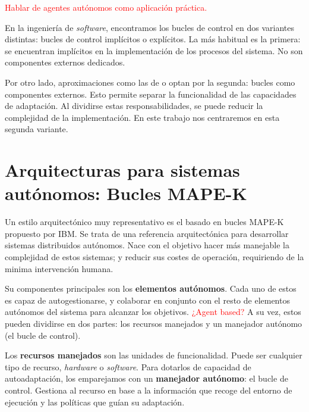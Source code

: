 \textcolor{red}{Hablar de agentes autónomos como aplicación práctica. \cite{savaglioAgentbasedInternetThings2020}}

En la ingeniería de \emph{software}, encontramos los bucles de control en dos variantes distintas: bucles de control implícitos o explícitos. La más habitual es la primera: se encuentran implícitos en la implementación de los procesos del sistema. \cite{brunEngineeringSelfAdaptiveSystems2009} No son componentes externos dedicados.

Por otro lado, aproximaciones como las de \cite{garlanIncreasingSystemDependability2003} o \cite{ibmcorporationArchitecturalBlueprintAutonomic2006} optan por la segunda: bucles como componentes externos. Esto permite separar la funcionalidad de las capacidades de adaptación.  Al dividirse estas responsabilidades, se puede reducir la complejidad de la implementación. En este trabajo nos centraremos en esta segunda variante.

\section{Arquitecturas para sistemas autónomos: Bucles MAPE-K}
\label{sec:bucles-mapek}


Un estilo arquitectónico muy representativo es el basado en bucles MAPE-K \cite{ibmcorporationArchitecturalBlueprintAutonomic2006, fonsServiciosAdaptivereadyPara2021} propuesto por IBM. Se trata de una referencia arquitectónica para desarrollar sistemas distribuidos autónomos. Nace con el objetivo hacer más manejable la complejidad de estos sistemas; y reducir sus costes de operación, requiriendo de la minima intervención humana.

Su componentes principales son los \textbf{elementos autónomos}. Cada uno de estos es capaz de autogestionarse, y colaborar en conjunto con el resto de elementos autónomos del sistema  para alcanzar los objetivos. \textcolor{red}{¿Agent based?} A su vez, estos pueden dividirse en dos partes: los recursos manejados y un manejador autónomo (el bucle de control).

Los \textbf{recursos manejados} son las unidades de funcionalidad. Puede ser cualquier tipo de recurso, \emph{hardware} o \emph{software}. Para dotarlos de capacidad de autoadaptación, los emparejamos con un \textbf{manejador autónomo}: el bucle de control. Gestiona al recurso en base a la información que recoge del entorno de ejecución y las políticas que guían su adaptación.

